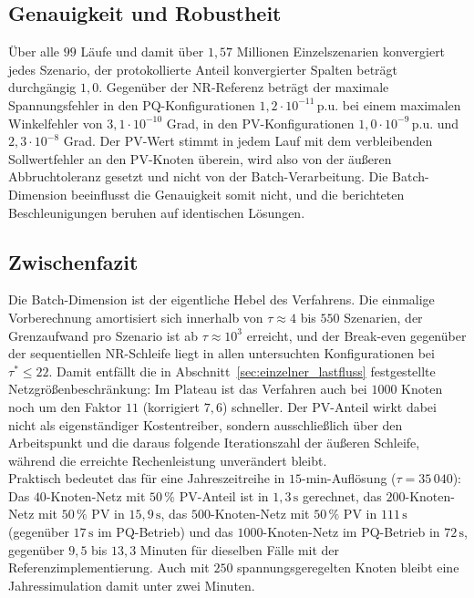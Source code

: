 \subsection{Genauigkeit und Robustheit}
\label{subsec:batch_genauigkeit}

Über alle $99$ Läufe und damit über $1{,}57$ Millionen Einzelszenarien
konvergiert jedes Szenario, der protokollierte Anteil konvergierter Spalten
beträgt durchgängig $1{,}0$. Gegenüber der NR-Referenz beträgt der maximale
Spannungsfehler in den PQ-Konfigurationen $1{,}2\cdot10^{-11}\,\text{p.u.}$ bei
einem maximalen Winkelfehler von $3{,}1\cdot10^{-10}$ Grad, in den
PV-Konfigurationen $1{,}0\cdot10^{-9}\,\text{p.u.}$ und $2{,}3\cdot10^{-8}$
Grad. Der PV-Wert stimmt in jedem Lauf mit dem verbleibenden Sollwertfehler an
den PV-Knoten überein, wird also von der äußeren Abbruchtoleranz gesetzt und
nicht von der Batch-Verarbeitung. Die Batch-Dimension beeinflusst die
Genauigkeit somit nicht, und die berichteten Beschleunigungen beruhen auf
identischen Lösungen.

\subsection{Zwischenfazit}
\label{subsec:batch_fazit}

Die Batch-Dimension ist der eigentliche Hebel des Verfahrens. Die einmalige
Vorberechnung amortisiert sich innerhalb von $\tau\approx4$ bis $550$
Szenarien, der Grenzaufwand pro Szenario ist ab $\tau\approx10^3$ erreicht,
und der Break-even gegenüber der sequentiellen NR-Schleife liegt in allen
untersuchten Konfigurationen bei $\tau^\ast\le22$. Damit entfällt die in
Abschnitt~\ref{sec:einzelner_lastfluss} festgestellte
Netzgrößenbeschränkung: Im Plateau ist das Verfahren auch bei $1000$ Knoten
noch um den Faktor $11$ (korrigiert $7{,}6$) schneller. Der PV-Anteil wirkt
dabei nicht als eigenständiger Kostentreiber, sondern ausschließlich über den
Arbeitspunkt und die daraus folgende Iterationszahl der äußeren Schleife,
während die erreichte Rechenleistung unverändert bleibt.\\

Praktisch bedeutet das für eine Jahreszeitreihe in $15$-min-Auflösung
($\tau=35\,040$): Das $40$-Knoten-Netz mit $50\,\%$ PV-Anteil ist in
$1{,}3\,\mathrm{s}$ gerechnet, das $200$-Knoten-Netz mit $50\,\%$ PV in
$15{,}9\,\mathrm{s}$, das $500$-Knoten-Netz mit $50\,\%$ PV in
$111\,\mathrm{s}$ (gegenüber $17\,\mathrm{s}$ im PQ-Betrieb) und das
$1000$-Knoten-Netz im PQ-Betrieb in $72\,\mathrm{s}$, gegenüber $9{,}5$ bis
$13{,}3$ Minuten für dieselben Fälle mit der Referenzimplementierung. Auch mit
$250$ spannungsgeregelten Knoten bleibt eine Jahressimulation damit unter zwei
Minuten.\\

